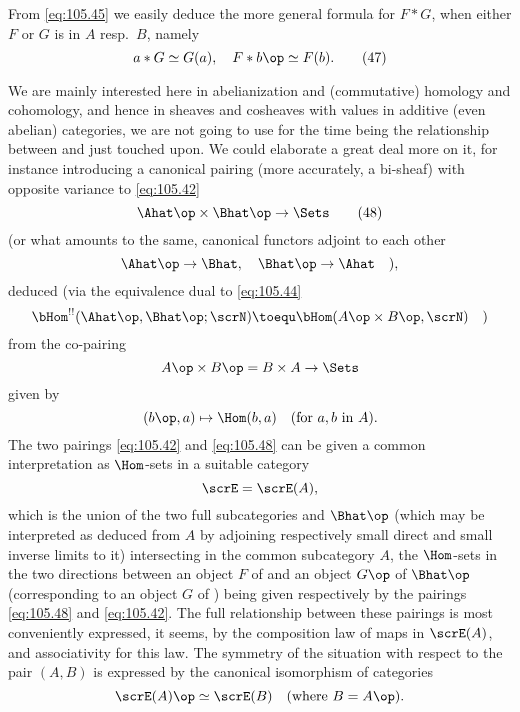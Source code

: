 From \eqref{eq:105.45} we easily deduce the more general formula for
$F*G$, when either $F$ or $G$ is in $A$ resp.\ $B$, namely
\begin{equation}
  \label{eq:105.47}
  a * G \simeq G(a), \quad F * b\op \simeq F(b).\tag{47}
\end{equation}
\begin{remarks}
  We are mainly interested here in abelianization and (commutative)
  homology and cohomology, and hence in sheaves and cosheaves with
  values in additive (even abelian) categories, we are not going to
  use for the time being the relationship between \Ahat{} and \Bhat{}
  just touched upon. We could elaborate a great deal more on it, for
  instance introducing a canonical pairing (more accurately, a
  bi-sheaf) with opposite variance to \eqref{eq:105.42}
  \begin{equation}
    \label{eq:105.48}
    \Ahat\op\times\Bhat\op\to\Sets\tag{48}
  \end{equation}
  (or what amounts to the same, canonical functors adjoint to each
  other
  \[\Ahat\op\to\Bhat,\quad\Bhat\op\to\Ahat\quad),\]
  deduced (via the equivalence dual to \eqref{eq:105.44}
  \[\bHom^{!!}(\Ahat\op,\Bhat\op;\scrN) \toequ \bHom(A\op\times
  B\op,\scrN)\quad)\]
  from the co-pairing
  \[A\op\times B\op=B\times A\to\Sets\]
  given by
  \[(b\op,a)\mapsto\Hom(b,a)\quad(\text{for $a,b$ in $A$}).\]
  The two pairings \eqref{eq:105.42} and \eqref{eq:105.48} can be
  given a common interpretation as $\Hom$-sets in a suitable category
  \[\scrE=\scrE(A),\]
  which is the union of the two full subcategories \Ahat{} and
  $\Bhat\op$ (which may be interpreted as deduced from $A$ by
  adjoining respectively small direct and small inverse limits to it)
  intersecting in the common subcategory $A$, the $\Hom$-sets in the
  two directions between an object $F$ of \Ahat{} and an object $G\op$
  of $\Bhat\op$ (corresponding to an object $G$ of \Bhat) being given
  respectively by the pairings \eqref{eq:105.48} and
  \eqref{eq:105.42}.
  The full relationship between these pairings is most conveniently
  expressed, it seems, by the composition law of maps in $\scrE(A)$,
  and associativity for this law. The symmetry of the situation with
  respect to the pair $(A,B)$ is expressed by the canonical
  isomorphism of categories
  \[\scrE(A)\op\simeq\scrE(B)\quad (\text{where $B=A\op$}).\]
\end{remarks}

